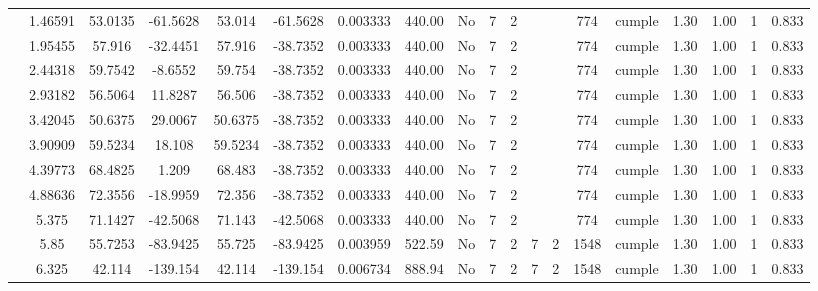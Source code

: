 \begin{table}[H]
{\begin{tabular}{|c|c|c|c|c|c|r|c|c|c|c|c|c|c|c|c|c|c|c|}
\cline{2-19}        & 1.46591 & 53.0135 & -61.5628 & 53.014 & \multicolumn{1}{c}{-61.5628} & 0.003333 & 440.00 & No  & 7   & 2   &     &     & 774 & \cellcolor[rgb]{ .776,  .937,  .808}cumple & 1.30 & 1.00 & 1   & 0.833 \bigstrut\\
\cline{2-19}        & 1.95455 & 57.916 & -32.4451 & 57.916 & -38.7352 & 0.003333 & 440.00 & No  & 7   & 2   &     &     & 774 & \cellcolor[rgb]{ .776,  .937,  .808}cumple & 1.30 & 1.00 & 1   & 0.833 \bigstrut\\
\cline{2-19}        & 2.44318 & 59.7542 & -8.6552 & 59.754 & -38.7352 & 0.003333 & 440.00 & No  & 7   & 2   &     &     & 774 & \cellcolor[rgb]{ .776,  .937,  .808}cumple & 1.30 & 1.00 & 1   & 0.833 \bigstrut\\
\cline{2-19}        & 2.93182 & 56.5064 & 11.8287 & 56.506 & -38.7352 & 0.003333 & 440.00 & No  & 7   & 2   &     &     & 774 & \cellcolor[rgb]{ .776,  .937,  .808}cumple & 1.30 & 1.00 & 1   & 0.833 \bigstrut\\
\cline{2-19}        & 3.42045 & 50.6375 & 29.0067 & 50.6375 & -38.7352 & 0.003333 & 440.00 & No  & 7   & 2   &     &     & 774 & \cellcolor[rgb]{ .776,  .937,  .808}cumple & 1.30 & 1.00 & 1   & 0.833 \bigstrut\\
\cline{2-19}        & 3.90909 & 59.5234 & 18.108 & 59.5234 & -38.7352 & 0.003333 & 440.00 & No  & 7   & 2   &     &     & 774 & \cellcolor[rgb]{ .776,  .937,  .808}cumple & 1.30 & 1.00 & 1   & 0.833 \bigstrut\\
\cline{2-19}        & 4.39773 & 68.4825 & 1.209 & 68.483 & -38.7352 & 0.003333 & 440.00 & No  & 7   & 2   &     &     & 774 & \cellcolor[rgb]{ .776,  .937,  .808}cumple & 1.30 & 1.00 & 1   & 0.833 \bigstrut\\
\cline{2-19}        & 4.88636 & 72.3556 & -18.9959 & 72.356 & -38.7352 & 0.003333 & 440.00 & No  & 7   & 2   &     &     & 774 & \cellcolor[rgb]{ .776,  .937,  .808}cumple & 1.30 & 1.00 & 1   & 0.833 \bigstrut\\
\cline{2-19}        & 5.375 & 71.1427 & -42.5068 & 71.143 & -42.5068 & 0.003333 & 440.00 & No  & 7   & 2   &     &     & 774 & \cellcolor[rgb]{ .776,  .937,  .808}cumple & 1.30 & 1.00 & 1   & 0.833 \bigstrut\\
\cline{2-19}        & 5.85 & 55.7253 & -83.9425 & 55.725 & -83.9425 & 0.003959 & 522.59 & No  & 7   & 2   & 7   & 2   & 1548 & \cellcolor[rgb]{ .776,  .937,  .808}cumple & 1.30 & 1.00 & 1   & 0.833 \bigstrut\\
\cline{2-19}        & 6.325 & 42.114 & -139.154 & 42.114 & -139.154 & 0.006734 & 888.94 & No  & 7   & 2   & 7   & 2   & 1548 & \cellcolor[rgb]{ .776,  .937,  .808}cumple & 1.30 & 1.00 & 1   & 0.833 \bigstrut\\

\end{tabular}}
\end{table}
